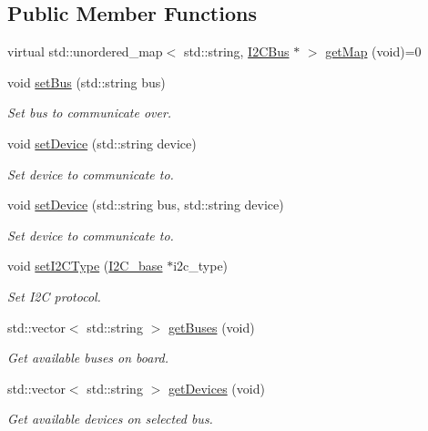 \subsection*{Public Member Functions}
\begin{DoxyCompactItemize}
\item 
virtual std\+::unordered\+\_\+map$<$ std\+::string, \hyperlink{class_i2_c_bus}{I2\+C\+Bus} $\ast$ $>$ \hyperlink{class_board_a7579517a69f81e2fcbe9e18857a11545}{get\+Map} (void)=0
\item 
void \hyperlink{class_board_ad01549e4fcb3d0dc2b7cab87b5d9be25}{set\+Bus} (std\+::string bus)
\begin{DoxyCompactList}\small\item\em Set bus to communicate over. \end{DoxyCompactList}\item 
void \hyperlink{class_board_aaa814c65e74c34a23deca4957b9c3e1c}{set\+Device} (std\+::string device)
\begin{DoxyCompactList}\small\item\em Set device to communicate to. \end{DoxyCompactList}\item 
void \hyperlink{class_board_ad6a4e4dec1a4be94b2eeb901e70fe710}{set\+Device} (std\+::string bus, std\+::string device)
\begin{DoxyCompactList}\small\item\em Set device to communicate to. \end{DoxyCompactList}\item 
void \hyperlink{class_board_ad8b29f72cded4b6a994b1999e91d7062}{set\+I2\+C\+Type} (\hyperlink{class_i2_c__base}{I2\+C\+\_\+base} $\ast$i2c\+\_\+type)
\begin{DoxyCompactList}\small\item\em Set I2C protocol. \end{DoxyCompactList}\item 
std\+::vector$<$ std\+::string $>$ \hyperlink{class_board_aa386db986f8d8865c3def1a941c79e2c}{get\+Buses} (void)
\begin{DoxyCompactList}\small\item\em Get available buses on board. \end{DoxyCompactList}\item 
std\+::vector$<$ std\+::string $>$ \hyperlink{class_board_a0be69177a3d368f3d02286d7114684cf}{get\+Devices} (void)
\begin{DoxyCompactList}\small\item\em Get available devices on selected bus. \end{DoxyCompactList}\item 

\end{DoxyCompactItemize}
